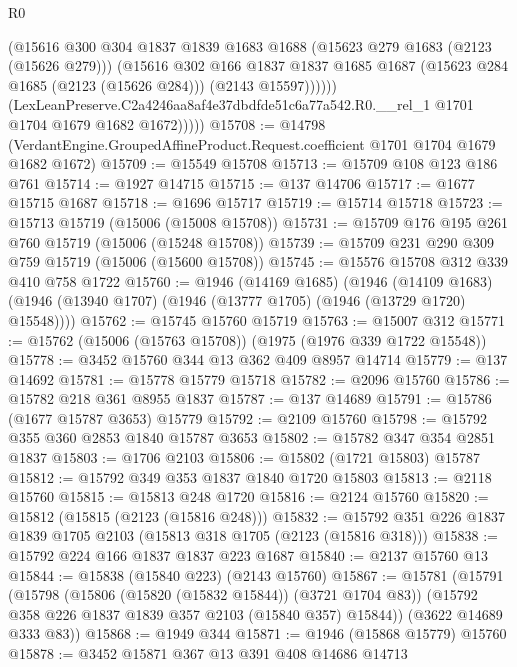 \begin{lexlean}{R0}
\begin{coremodule}
                  (@15616
                    @300
                    @304
                    @1837
                    @1839
                    @1683
                    @1688
                    (@15623 @279 @1683 (@2123 (@15626 @279)))
                    (@15616
                      @302
                      @166
                      @1837
                      @1837
                      @1685
                      @1687
                      (@15623 @284 @1685 (@2123 (@15626 @284)))
                      (@2143 @15597))))))
            (LexLeanPreserve.C2a4246aa8af4e37dbdfde51c6a77a542.R0.__rel_1
              @1701
              @1704
              @1679
              @1682
              @1672)))))
@15708 := @14798
    (VerdantEngine.GroupedAffineProduct.Request.coefficient @1701 @1704 @1679 @1682 @1672)
@15709 := @15549 @15708
@15713 := @15709 @108 @123 @186 @761
@15714 := @1927 @14715
@15715 := @137 @14706
@15717 := @1677 @15715 @1687
@15718 := @1696 @15717
@15719 := @15714 @15718
@15723 := @15713 @15719 (@15006 (@15008 @15708))
@15731 := @15709 @176 @195 @261 @760 @15719 (@15006 (@15248 @15708))
@15739 := @15709 @231 @290 @309 @759 @15719 (@15006 (@15600 @15708))
@15745 := @15576 @15708 @312 @339 @410 @758 @1722
@15760 := @1946
    (@14169 @1685)
    (@1946
      (@14109 @1683)
      (@1946 (@13940 @1707) (@1946 (@13777 @1705) (@1946 (@13729 @1720) @15548))))
@15762 := @15745 @15760 @15719
@15763 := @15007 @312
@15771 := @15762 (@15006 (@15763 @15708)) (@1975 (@1976 @339 @1722 @15548))
@15778 := @3452 @15760 @344 @13 @362 @409 @8957 @14714
@15779 := @137 @14692
@15781 := @15778 @15779 @15718
@15782 := @2096 @15760
@15786 := @15782 @218 @361 @8955 @1837
@15787 := @137 @14689
@15791 := @15786 (@1677 @15787 @3653) @15779
@15792 := @2109 @15760
@15798 := @15792 @355 @360 @2853 @1840 @15787 @3653
@15802 := @15782 @347 @354 @2851 @1837
@15803 := @1706 @2103
@15806 := @15802 (@1721 @15803) @15787
@15812 := @15792 @349 @353 @1837 @1840 @1720 @15803
@15813 := @2118 @15760
@15815 := @15813 @248 @1720
@15816 := @2124 @15760
@15820 := @15812 (@15815 (@2123 (@15816 @248)))
@15832 := @15792 @351 @226 @1837 @1839 @1705 @2103 (@15813 @318 @1705 (@2123 (@15816 @318)))
@15838 := @15792 @224 @166 @1837 @1837 @223 @1687
@15840 := @2137 @15760 @13
@15844 := @15838 (@15840 @223) (@2143 @15760)
@15867 := @15781
    (@15791
      (@15798
        (@15806 (@15820 (@15832 @15844)) (@3721 @1704 @83))
        (@15792 @358 @226 @1837 @1839 @357 @2103 (@15840 @357) @15844))
      (@3622 @14689 @333 @83))
@15868 := @1949 @344
@15871 := @1946 (@15868 @15779) @15760
@15878 := @3452 @15871 @367 @13 @391 @408 @14686 @14713

\end{coremodule}
\end{lexlean}
